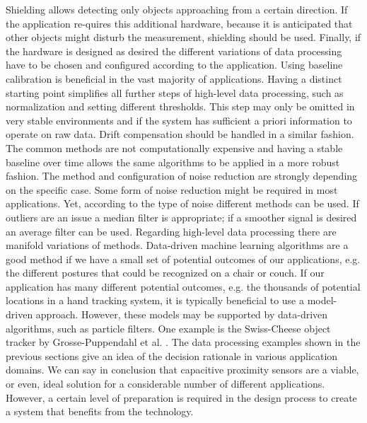Shielding allows detecting only objects approaching from a certain direction. If the application re-quires this additional hardware, because it is anticipated that other objects might disturb the measurement, shielding should be used.
Finally, if the hardware is designed as desired the different variations of data processing have to be chosen and configured according to the application.
Using baseline calibration is beneficial in the vast majority of applications. Having a distinct starting point simplifies all further steps of high-level data processing, such as normalization and setting different thresholds. This step may only be omitted in very stable environments and if the system has sufficient a priori information to operate on raw data. Drift compensation should be handled in a similar fashion. The common methods are not computationally expensive and having a stable baseline over time allows the same algorithms to be applied in a more robust fashion. The method and configuration of noise reduction are strongly depending on the specific case. Some form of noise reduction might be required in most applications. Yet, according to the type of noise different methods can be used. If outliers are an issue a median filter is appropriate; if a smoother signal is desired an average filter can be used. 
Regarding high-level data processing there are manifold variations of methods. Data-driven machine learning algorithms are a good method if we have a small set of potential outcomes of our applications, e.g. the different postures that could be recognized on a chair or couch. If our application has many different potential outcomes, e.g. the thousands of potential locations in a hand tracking system, it is typically beneficial to use a model-driven approach. However, these models may be supported by data-driven algorithms, such as particle filters. One example is the Swiss-Cheese object tracker by Grosse-Puppendahl et al. \cite{grosse2013swiss}. The data processing examples shown in the previous sections give an idea of the decision rationale in various application domains.
We can say in conclusion that capacitive proximity sensors are a viable, or even, ideal solution for a considerable number of different applications. However, a certain level of preparation is required in the design process to create a system that benefits from the technology.
